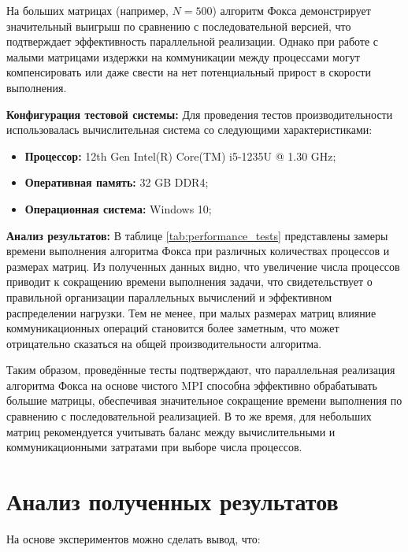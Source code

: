 \documentclass{report}
\begin{document}
На больших матрицах (например, $N=500$) алгоритм Фокса демонстрирует значительный выигрыш по сравнению с последовательной версией, что подтверждает эффективность параллельной реализации. Однако при работе с малыми матрицами издержки на коммуникации между процессами могут компенсировать или даже свести на нет потенциальный прирост в скорости выполнения.

\textbf{Конфигурация тестовой системы:} Для проведения тестов производительности использовалась вычислительная система со следующими характеристиками:

\begin{itemize}
    \item \textbf{Процессор:} 12th Gen Intel(R) Core(TM) i5-1235U @ 1.30 GHz;
    \item \textbf{Оперативная память:} 32 GB DDR4;
    \item \textbf{Операционная система:} Windows 10;
\end{itemize}

\textbf{Анализ результатов:} В таблице \ref{tab:performance_tests} представлены замеры времени выполнения алгоритма Фокса при различных количествах процессов и размерах матриц. Из полученных данных видно, что увеличение числа процессов приводит к сокращению времени выполнения задачи, что свидетельствует о правильной организации параллельных вычислений и эффективном распределении нагрузки. Тем не менее, при малых размерах матриц влияние коммуникационных операций становится более заметным, что может отрицательно сказаться на общей производительности алгоритма.

Таким образом, проведённые тесты подтверждают, что параллельная реализация алгоритма Фокса на основе чистого MPI способна эффективно обрабатывать большие матрицы, обеспечивая значительное сокращение времени выполнения по сравнению с последовательной реализацией. В то же время, для небольших матриц рекомендуется учитывать баланс между вычислительными и коммуникационными затратами при выборе числа процессов.

\newpage

\section*{Анализ полученных результатов}

На основе экспериментов можно сделать вывод, что:
\end{document}
